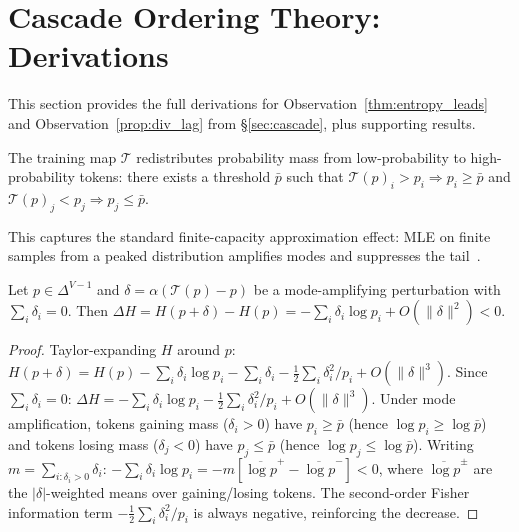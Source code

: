 \section{Cascade Ordering Theory: Derivations}
\label{app:cascade_theory}

This section provides the full derivations for Observation~\ref{thm:entropy_leads} and Observation~\ref{prop:div_lag} from \S\ref{sec:cascade}, plus supporting results.

\begin{assumption}\label{ass:mode_amp}
The training map $\mathcal{T}$ redistributes probability mass from low-probability to high-probability tokens: there exists a threshold $\bar{p}$ such that $\mathcal{T}(p)_i > p_i \Rightarrow p_i \geq \bar{p}$ and $\mathcal{T}(p)_j < p_j \Rightarrow p_j \leq \bar{p}$.
\end{assumption}

This captures the standard finite-capacity approximation effect: MLE on finite samples from a peaked distribution amplifies modes and suppresses the tail~\citep{shumailov2024curse,dohmatob2024tale}.

\begin{proposition}\label{prop:entropy_first}
Let $p \in \Delta^{V-1}$ and $\delta = \alpha(\mathcal{T}(p) - p)$ be a mode-amplifying perturbation with $\sum_i \delta_i = 0$. Then $\Delta H = H(p+\delta) - H(p) = -\sum_i \delta_i \log p_i + O(\|\delta\|^2) < 0$.
\end{proposition}

\begin{proof}
Taylor-expanding $H$ around $p$:
$H(p+\delta) = H(p) - \sum_i \delta_i \log p_i - \sum_i \delta_i - \frac{1}{2}\sum_i \delta_i^2/p_i + O(\|\delta\|^3)$.
Since $\sum_i \delta_i = 0$: $\Delta H = -\sum_i \delta_i \log p_i - \frac{1}{2}\sum_i \delta_i^2/p_i + O(\|\delta\|^3)$.
Under mode amplification, tokens gaining mass ($\delta_i > 0$) have $p_i \geq \bar{p}$ (hence $\log p_i \geq \log \bar{p}$) and tokens losing mass ($\delta_j < 0$) have $p_j \leq \bar{p}$ (hence $\log p_j \leq \log \bar{p}$).
Writing $m = \sum_{i:\delta_i > 0} \delta_i$: $-\sum_i \delta_i \log p_i = -m[\overline{\log p}^{+} - \overline{\log p}^{-}] < 0$, where $\overline{\log p}^{\pm}$ are the $|\delta|$-weighted means over gaining/losing tokens.
The second-order Fisher information term $-\frac{1}{2}\sum_i \delta_i^2/p_i$ is always negative, reinforcing the decrease.
\end{proof}

